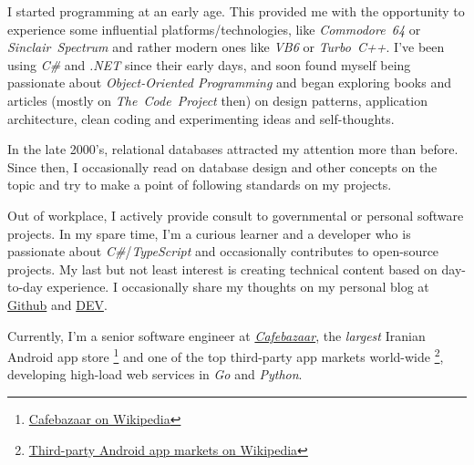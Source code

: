 \documentclass[10pt,a4paper]{article}
\begin{document}
\vspace{-1.3em} %
\begin{multicols}{2}  %
    \noindent
    I started programming at an early age. This provided me with the opportunity
    to experience some influential platforms/technologies, like
    \textit{Commodore~64} or \textit{Sinclair~Spectrum} and rather modern ones
    like \textit{VB6} or \textit{Turbo~C++}. I've been using \textit{C\#} and
    \textit{.NET} since their early days, and soon found myself being passionate
    about \textit{Object-Oriented Programming} and began exploring books and
    articles (mostly on \textit{The~Code~Project} then) on design patterns,
    application architecture, clean coding and experimenting ideas and
    self-thoughts.

    In the late 2000's, relational databases attracted my attention more than
    before. Since then, I occasionally read on database design and other
    concepts on the topic and try to make a point of following standards on my
    projects.

    Out of workplace, I actively provide consult to governmental or personal
    software projects. In my spare time, I'm a curious learner and a developer who
    is passionate about \textit{C\#}/\textit{TypeScript} and occasionally
    contributes to open-source projects. My last but not least interest is
    creating technical content based on day-to-day experience. I
    occasionally share my thoughts on my personal blog at
    \href{https://babakks.github.io}{Github} and
    \href{https://dev.to/babakks}{DEV}.

    Currently, I'm a senior software engineer at
    \href{https://cafebazaar.ir}{\emph{Cafebazaar}}, the \textit{largest}
    Iranian Android app store%
    \footnote{\label{cb-on-wiki}%
        \href{https://en.wikipedia.org/wiki/Cafe\_Bazaar}{Cafebazaar on Wikipedia}}%
    and one of the top third-party app markets world-wide%
    \footnote{\label{3rd-party-stores-on-wiki}%
        \href{https://en.wikipedia.org/wiki/List\_of\_mobile\_app\_distribution\_platforms\#Third-party\_platforms}%
        {Third-party Android app markets on Wikipedia}},
    developing high-load web services in \textit{Go} and \textit{Python}.
\end{multicols}
\spacedhrule{0.5em}{-0.4em}

\end{document}
